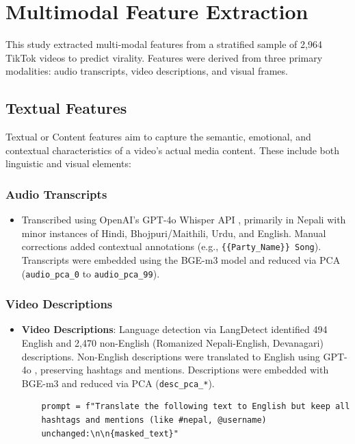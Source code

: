 \documentclass[12pt,a4paper]{report}
\begin{document}
\section{Multimodal Feature Extraction}

This study extracted multi-modal features from a stratified sample of 2,964 TikTok videos to predict virality. Features were derived from three primary modalities: audio transcripts, video descriptions, and visual frames.

\subsection{Textual Features}
Textual or Content features aim to capture the semantic, emotional, and contextual characteristics of a video’s actual media content. These include both linguistic and visual elements:

\subsubsection{Audio Transcripts}

\begin{itemize}
    \item Transcribed using OpenAI’s GPT-4o Whisper API \parencite{OpenAI2024gpt4o}, primarily in Nepali with minor instances of Hindi, Bhojpuri/Maithili, Urdu, and English. Manual corrections added contextual annotations (e.g., \texttt{\{\{Party\_Name\}\} Song}). Transcripts were embedded using the BGE-m3 model \parencite{bge-m3} and reduced via PCA (\texttt{audio\_pca\_0} to \texttt{audio\_pca\_99}).
\end{itemize}

\subsubsection{Video Descriptions}

\begin{itemize}
    \item \textbf{Video Descriptions}: Language detection via LangDetect \parencite{langdetect} identified 494 English and 2,470 non-English (Romanized Nepali-English, Devanagari) descriptions. Non-English descriptions were translated to English using GPT-4o \parencite{OpenAI2024gpt4o}, preserving hashtags and mentions. Descriptions were embedded with BGE-m3 and reduced via PCA (\texttt{desc\_pca\_*}).

    \begin{verbatim}
    prompt = f"Translate the following text to English but keep all 
    hashtags and mentions (like #nepal, @username) 
    unchanged:\n\n{masked_text}"
    \end{verbatim}
\end{itemize}
\newpage
\end{document}
